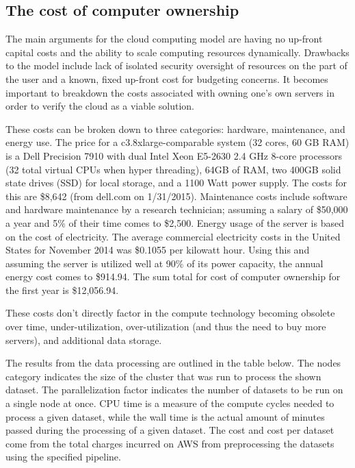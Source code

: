 \documentclass{frontiersSCNS} %
\begin{document}
\subsection{The cost of computer ownership}
The main arguments for the cloud computing model are having no up-front capital costs and the ability to scale computing resources dynamically. Drawbacks to the model include lack of isolated security oversight of resources on the part of the user and a known, fixed up-front cost for budgeting concerns. It becomes important to breakdown the costs associated with owning one’s own servers in order to verify the cloud as a viable solution.


These costs can be broken down to three categories: hardware, maintenance, and energy use. The price for a c3.8xlarge-comparable system (32 cores, 60 GB RAM) is a Dell Precision 7910 with dual Intel Xeon E5-2630 2.4 GHz 8-core processors (32 total virtual CPUs when hyper threading), 64GB of RAM, two 400GB solid state drives (SSD) for local storage, and a 1100 Watt power supply. The costs for this are \$8,642 (from dell.com on 1/31/2015). Maintenance costs include software and hardware maintenance by a research technician; assuming a salary of \$50,000 a year and 5\% of their time comes to \$2,500. Energy usage of the server is based on the cost of electricity. The average commercial electricity costs in the United States for November 2014 was \$0.1055 per kilowatt hour. Using this and assuming the server is utilized well at 90\% of its power capacity, the annual energy cost comes to \$914.94. The sum total for cost of computer ownership for the first year is \$12,056.94.


These costs don’t directly factor in the compute technology becoming obsolete over time, under-utilization, over-utilization (and thus the need to buy more servers), and additional data storage.


The results from the data processing are outlined in the table below. The nodes category indicates the size of the cluster that was run to process the shown dataset. The parallelization factor indicates the number of datasets to be run on a single node at once. CPU time is a measure of the compute cycles needed to process a given dataset, while the wall time is the actual amount of minutes passed during the processing of a given dataset. The cost and cost per dataset come from the total charges incurred on AWS from preprocessing the datasets using the specified pipeline.
\end{document}
